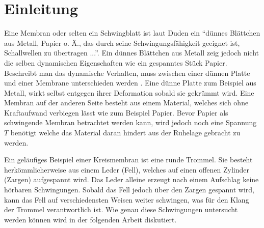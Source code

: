 %
%
%
\section{Einleitung\label{kreismembran:section:teil0}}
Eine Membran oder selten ein Schwingblatt ist laut Duden \cite{kreismembran:Duden:Membran} ein ``dünnes Blättchen aus Metall, Papier o. Ä., das durch seine Schwingungsfähigkeit geeignet ist, Schallwellen zu übertragen ...''. 
Ein dünnes Blättchen aus Metall zeig jedoch nicht die selben dynamischen Eigenschaften wie ein gespanntes Stück Papier. 
Beschreibt man das dynamische Verhalten, muss zwischen einer dünnen Platte und einer Membrane unterschieden werden \cite{kreismembran:membrane_vs_thin_plate}. 
Eine dünne Platte zum Beispiel aus Metall, wirkt selbst entgegen ihrer Deformation sobald sie gekrümmt wird. 
Eine Membran auf der anderen Seite besteht aus einem Material, welches sich ohne Kraftaufwand verbiegen lässt wie zum Beispiel Papier. 
Bevor Papier als schwingende Membran betrachtet werden kann, wird jedoch noch eine Spannung $ T $ benötigt welche das Material daran hindert aus der Ruhelage gebracht zu werden. 

Ein geläufiges Beispiel einer Kreismembran ist eine runde Trommel. 
Sie besteht herkömmlicherweise aus einem Leder (Fell), welches auf einen offenen Zylinder (Zargen) aufgespannt wird. 
Das Leder alleine erzeugt nach einem Aufschlag keine hörbaren Schwingungen. 
Sobald das Fell jedoch über den Zargen gespannt wird, kann das Fell auf verschiedensten Weisen weiter schwingen, was für den Klang der Trommel verantwortlich ist. 
Wie genau diese Schwingungen untersucht werden können wird in der folgenden Arbeit diskutiert.


